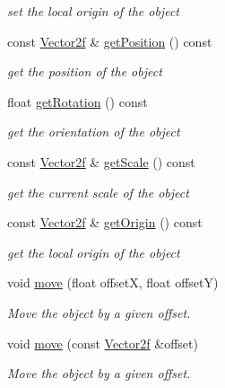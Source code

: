 \begin{DoxyCompactItemize}
\begin{DoxyCompactList}\small\item\em set the local origin of the object \end{DoxyCompactList}\item 
const \hyperlink{classsf_1_1Vector2}{Vector2f} \& \hyperlink{classsf_1_1Transformable_a6a0552d8cf155b7df25f6ceda8ee45a5}{get\-Position} () const 
\begin{DoxyCompactList}\small\item\em get the position of the object \end{DoxyCompactList}\item 
float \hyperlink{classsf_1_1Transformable_ad783a7e9971398ec613d22455252809e}{get\-Rotation} () const 
\begin{DoxyCompactList}\small\item\em get the orientation of the object \end{DoxyCompactList}\item 
const \hyperlink{classsf_1_1Vector2}{Vector2f} \& \hyperlink{classsf_1_1Transformable_a3ea9639abd7a430ac99afb0aaf1ea562}{get\-Scale} () const 
\begin{DoxyCompactList}\small\item\em get the current scale of the object \end{DoxyCompactList}\item 
const \hyperlink{classsf_1_1Vector2}{Vector2f} \& \hyperlink{classsf_1_1Transformable_a6bddc485d22bb64449d9d2d3a99a778f}{get\-Origin} () const 
\begin{DoxyCompactList}\small\item\em get the local origin of the object \end{DoxyCompactList}\item 
void \hyperlink{classsf_1_1Transformable_a86b461d6a941ad390c2ad8b6a4a20391}{move} (float offset\-X, float offset\-Y)
\begin{DoxyCompactList}\small\item\em Move the object by a given offset. \end{DoxyCompactList}\item 
void \hyperlink{classsf_1_1Transformable_ab9ca691522f6ddc1a40406849b87c469}{move} (const \hyperlink{classsf_1_1Vector2}{Vector2f} \&offset)
\begin{DoxyCompactList}\small\item\em Move the object by a given offset. \end{DoxyCompactList}\item 

\end{DoxyCompactItemize}
